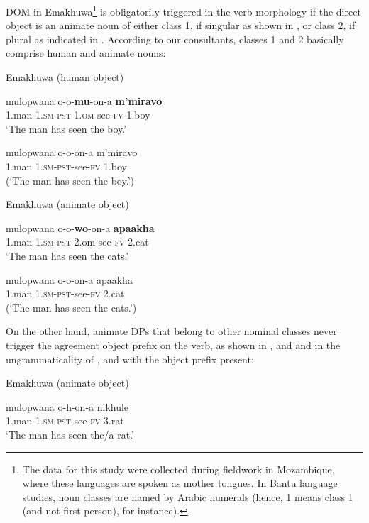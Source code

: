\documentclass[output=paper]{langsci/langscibook}
\begin{document}
DOM in Emakhuwa\footnote{ {The data for this study were collected during fieldwork in Mozambique, where these languages are spoken as mother tongues. In Bantu language studies, noun classes are named by Arabic numerals (hence, 1 means class 1 (and not first person), for instance).}} is obligatorily triggered in the verb morphology if the direct object is an animate noun of either class 1, if singular as shown in , or class 2, if plural as indicated in . According to our consultants, classes 1 and 2 basically comprise human and animate nouns:

{Emakhuwa (human object)}

\ea
\gll mulopwana            o-o-\textbf{mu}{}-on-a                    \textbf{m’miravo}\\
     1.man                    1.{\textsc{sm}}\textsc{{}-}{\textsc{pst}}\textsc{{}-1.}{\textsc{om}}{}-see-{\textsc{fv}}     1.boy\\
\glt ‘The man has seen the boy.’
\z


\ea
\gll *mulopwana          o-o-on-a                          m’miravo\\
     1.man                    1.{\textsc{sm}}\textsc{{}-}{\textsc{pst}}{}-see-{\textsc{fv}}              1.boy\\
\glt (‘The man has seen the boy.’)
\z


{Emakhuwa (animate object)}

\ea
\gll mulopwana           o-o-\textbf{wo}{}-on-a                    \textbf{apaakha}\\
     {1.man                   1.}{\textsc{sm-pst}}{{}-2.om-see-}{\textsc{fv}}      {2.cat}\\
\glt  ‘The man has seen the cats.’
\z


\ea
\gll *mulopwana         o-o-on-a                         apaakha\\
     {1.man                    1}{\textsc{.sm-pst}}{{}-see-}{\textsc{fv}}             {2.cat}\\
\glt (‘The man has seen the cats.’)
\z

On the other hand, animate DPs that belong to other nominal classes never trigger the agreement object prefix on the verb, as shown in ,  and  and in the ungrammaticality of ,  and  with the object prefix  present:

{Emakhuwa (animate object)}

\ea
\gll mulopwana          o-h-on-a                       nikhule\\
     {1.man                  }{\textsc{1.sm-pst}}{{}-see-}{\textsc{fv}}            {3.rat}\\
\glt ‘The man has seen the/a rat.’
\z
\end{document}

